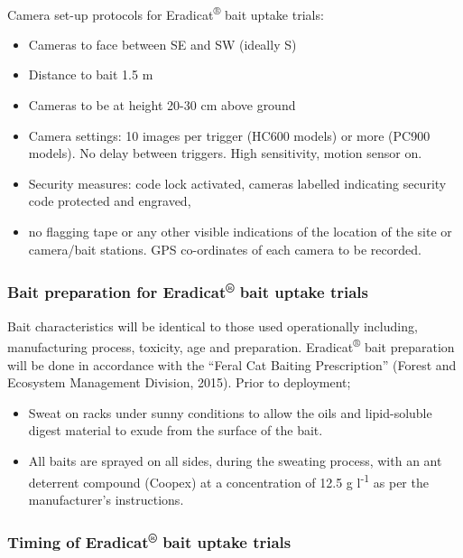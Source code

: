 \documentclass[version=last,
    paper=a4,                               %
    10pt,                                   %
    dvipsnames,
    oneside,                              %
    headings=openany,                       %
    open=any,
    BCOR=7mm,                               %
    DIV=15,     %
]{scrbook}
\begin{document}
~

Camera set-up protocols for Eradicat\textsuperscript{®} bait uptake
trials:

\begin{itemize}
\itemsep1pt\parskip0pt
\item
  Cameras to face between SE and SW (ideally S)
\item
  Distance to bait 1.5 m
\item
  Cameras to be at height 20-30 cm above ground
\item
  Camera settings: 10 images per trigger (HC600 models) or more (PC900
  models). No delay between triggers. High sensitivity, motion sensor
  on.
\item
  Security measures: code lock activated, cameras labelled indicating
  security code protected and engraved,
\item
  no flagging tape or any other visible indications of the location of
  the site or camera/bait stations. GPS co-ordinates of each camera to
  be recorded.
\end{itemize}

\subsubsection{Bait preparation for Eradicat\textsuperscript{®} bait
uptake trials}

Bait characteristics will be identical to those used operationally
including, manufacturing process, toxicity, age and preparation.
Eradicat\textsuperscript{®} bait preparation will be done in accordance
with the ``Feral Cat Baiting Prescription'' (Forest and Ecosystem
Management Division, 2015). Prior to deployment;

\begin{itemize}
\itemsep1pt\parskip0pt
\item
  Sweat on racks under sunny conditions to allow the oils and
  lipid-soluble digest material to exude from the surface of the bait.
\item
  All baits are sprayed on all sides, during the sweating process, with
  an ant deterrent compound (Coopex) at a concentration of 12.5 g
  l\textsuperscript{-1} as per the manufacturer's instructions.
\end{itemize}

\subsubsection{Timing of Eradicat\textsuperscript{®} bait uptake trials}
\end{document}
